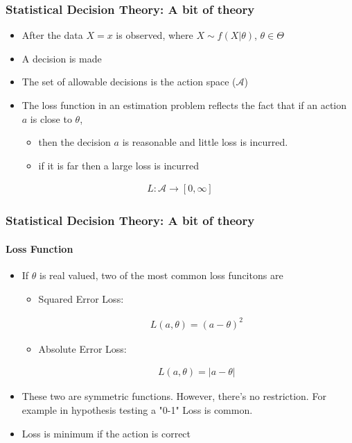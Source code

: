 \documentclass[
  shownotes,
  xcolor={svgnames},
  hyperref={colorlinks,citecolor=DarkBlue,linkcolor=DarkRed,urlcolor=DarkBlue}
  ]{beamer}
\begin{document}

\begin{frame}
\frametitle{Statistical Decision Theory: A bit of theory}


\begin{itemize}
  \item After the data $X=x$ is observed, where $X\sim f(X|\theta)$, $\theta \in \Theta$
  \item A decision is made
  \item The set of allowable decisions is the action space ($\mathcal{A}$)
  \item The loss function in an estimation problem reflects the fact that if an action $a$ is close to $\theta$,
  \begin{itemize}
   \item then the decision $a$ is reasonable and little loss is incurred.
   \item if it is far then a large loss is incurred
  \end{itemize}
\end{itemize}

\begin{align}
    L:\mathcal{A}\rightarrow\left[0,\infty\right]
\end{align}


\end{frame}

\begin{frame}
\frametitle{Statistical Decision Theory: A bit of theory}
\framesubtitle{Loss Function}

\begin{itemize}
\item If $\theta$ is real valued, two of the most common loss funcitons are

\begin{itemize}
  \item Squared Error Loss:
  
  \begin{align}
      L(a,\theta)=(a-\theta)^{2}
  \end{align}
    
    \item Absolute Error Loss:

    \begin{align}
      L(a,\theta)=|a-\theta|
    \end{align}
\end{itemize}


\item These two are symmetric functions. However, there's no restriction. For example in hypothesis testing a "0-1" Loss is common.
\item Loss is minimum if the action is correct
\end{itemize}
\end{frame}
\end{document}
